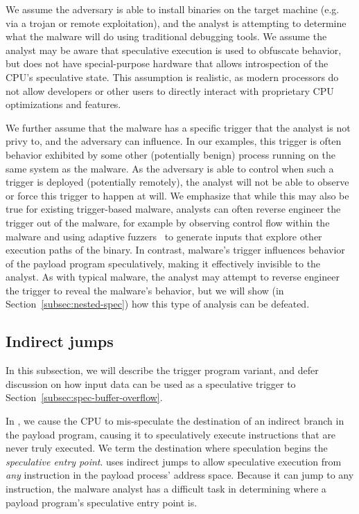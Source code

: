 We assume the adversary is able to install binaries on the target machine (e.g.
via a trojan or remote exploitation), and the analyst is attempting to determine
what the malware will do using traditional debugging tools. We assume the
analyst may be aware that speculative execution is used to obfuscate behavior,
but does not have special-purpose hardware that allows introspection of the
CPU's speculative state. This assumption is realistic, as modern processors do
not allow developers or other users to directly interact with proprietary CPU
optimizations and features.

We further assume that the malware has a specific trigger that the analyst is
not privy to, and the adversary can influence. In our examples, this
trigger is often behavior exhibited by some other (potentially benign) process
running on the same system as the malware. As the adversary is able to control
when such a trigger is deployed (potentially remotely), the analyst will not be
able to observe or force this trigger to happen at will. We emphasize that while
this may also be true for existing trigger-based malware, analysts can often
reverse engineer the trigger out of the malware, for example by observing
control flow within the malware and using adaptive
fuzzers~\cite{afl,stephens2016driller} to generate inputs that explore other
execution paths of the binary. In contrast, \speculake malware's trigger
influences behavior of the payload program speculatively, making it effectively
invisible to the analyst. As with typical
malware, the analyst may attempt to reverse engineer the trigger to reveal the
malware's behavior, but we will show (in Section~\ref{subsec:nested-spec}) how
this type of analysis can be defeated.

\subsection{Indirect jumps}

In this subsection, we will describe the trigger program variant, and defer
discussion on how input data can be used as a speculative trigger to
Section~\ref{subsec:spec-buffer-overflow}.

In \speculake, we cause the CPU to mis-speculate the destination of an indirect
branch in the payload program, causing it to speculatively execute 
instructions that are never truly executed. We term the destination where speculation begins
the \emph{speculative entry point}. \speculake uses indirect jumps to allow
speculative execution from \emph{any} instruction in the payload process'
address space. Because it can jump to any instruction, the malware analyst has a
difficult task in determining where a payload program's speculative entry point
is.

